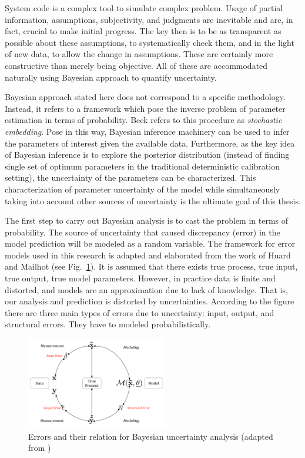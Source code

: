 \documentclass[11pt,titlepage]{article}
\begin{document}
System code is a complex tool to simulate complex problem. Usage of partial information, assumptions, subjectivity, and judgments are inevitable and are, in fact, crucial to make initial progress. The key then is to be as transparent as possible about these assumptions, to systematically check them, and in the light of new data, to allow the change in assumptions. These are certainly more constructive than merely being objective. All of these are accommodated naturally using Bayesian approach to quantify uncertainty.

Bayesian approach stated here does not correspond to a specific methodology. Instead, it refers to a framework which pose the inverse problem of parameter estimation in terms of probability. Beck \cite{Beck2010} refers to this procedure as \emph{stochastic embedding}. Pose in this way, Bayesian inference machinery can be used to infer the parameters of interest given the available data. Furthermore, as the key idea of Bayesian inference is to explore the posterior distribution (instead of finding single set of optimum parameters in the traditional deterministic calibration setting), the uncertainty of the parameters can be characterized. This characterization of parameter uncertainty of the model while simultaneously taking into account other sources of uncertainty is the ultimate goal of this thesis. 

The first step to carry out Bayesian analysis is to cast the problem in terms of probability. The source of uncertainty that caused discrepancy (error) in the model prediction will be modeled as a random variable. The framework for error models used in this research is adapted and elaborated from the work of Huard and Mailhot \cite{HuardMailhot2006} (see Fig.~\ref{fig:HuardMailhot}). It is assumed that there exists true process, true input, true output, true model parameters. However, in practice data is finite and distorted, and models are an approximation due to lack of knowledge. That is, our analysis and prediction is distorted by uncertainties. According to the figure there are three main types of errors due to uncertainty: input, output, and structural errors. They have to modeled probabilistically.
\begin{figure}[htbp]
	\centering
	\includegraphics[width=0.55\textwidth]{HuardMailhot.pdf}
	\caption{Errors and their relation for Bayesian uncertainty analysis (adapted from \cite{HuardMailhot2006})}
	\label{fig:HuardMailhot}
\end{figure}
\end{document}
